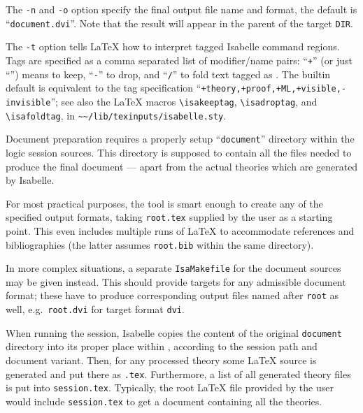 \begin{isabellebody}
\begin{isamarkuptext}
  \medskip The \verb|-n| and \verb|-o| option specify
  the final output file name and format, the default is ``\verb|document.dvi|''.  Note that the result will appear in the parent of
  the target \verb|DIR|.

  \medskip The \verb|-t| option tells {\LaTeX} how to interpret
  tagged Isabelle command regions.  Tags are specified as a comma
  separated list of modifier/name pairs: ``\verb|+|'' (or just ``'') means to keep, ``\verb|-|'' to drop, and ``\verb|/|'' to
  fold text tagged as .  The builtin default is equivalent
  to the tag specification ``\verb|+theory,+proof,+ML,+visible,-invisible|''; see also the {\LaTeX}
  macros \verb|\isakeeptag|, \verb|\isadroptag|, and
  \verb|\isafoldtag|, in \verb|~~/lib/texinputs/isabelle.sty|.

  \medskip Document preparation requires a properly setup ``\verb|document|'' directory within the logic session sources.  This
  directory is supposed to contain all the files needed to produce the
  final document --- apart from the actual theories which are
  generated by Isabelle.

  \medskip For most practical purposes, the \hyperlink{tool.document}{\mbox{}} tool is
  smart enough to create any of the specified output formats, taking
  \verb|root.tex| supplied by the user as a starting point.  This
  even includes multiple runs of {\LaTeX} to accommodate references
  and bibliographies (the latter assumes \verb|root.bib| within
  the same directory).

  In more complex situations, a separate \verb|IsaMakefile| for
  the document sources may be given instead.  This should provide
  targets for any admissible document format; these have to produce
  corresponding output files named after \verb|root| as well,
  e.g.\ \verb|root.dvi| for target format \verb|dvi|.

  \medskip When running the session, Isabelle copies the content of
  the original \verb|document| directory into its proper place
  within \hyperlink{setting.ISABELLE-BROWSER-INFO}{\mbox{}}, according to the session
  path and document variant.  Then, for any processed theory 
  some {\LaTeX} source is generated and put there as \verb|.tex|.  Furthermore, a list of all generated theory
  files is put into \verb|session.tex|.  Typically, the root
  {\LaTeX} file provided by the user would include \verb|session.tex| to get a document containing all the theories.


\end{isamarkuptext}
\end{isabellebody}
